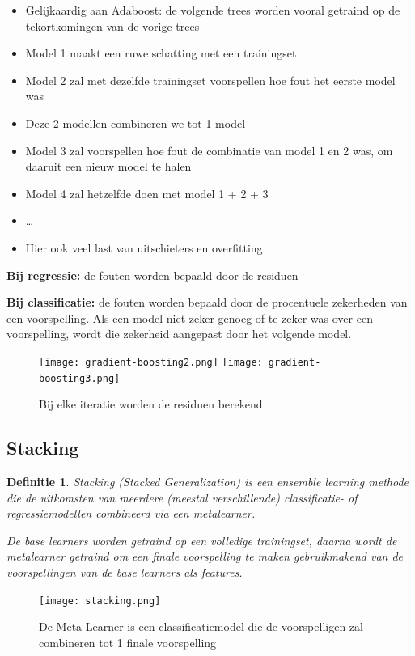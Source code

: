 \documentclass{article}
\newtheorem{theorem}{Definitie}[section]
\begin{document}
\begin{itemize}
    \item Gelijkaardig aan Adaboost: de volgende trees worden vooral getraind op de tekortkomingen van de vorige trees
    \item Model 1 maakt een ruwe schatting met een trainingset
    \item Model 2 zal met dezelfde trainingset voorspellen hoe fout het eerste model was
    \item Deze 2 modellen combineren we tot 1 model
    \item Model 3 zal voorspellen hoe fout de combinatie van model 1 en 2 was, om daaruit een nieuw model te halen
    \item Model 4 zal hetzelfde doen met model 1 + 2 + 3
    \item \dots
    \item Hier ook veel last van uitschieters en overfitting
\end{itemize}

\textbf{Bij regressie:} de fouten worden bepaald door de residuen

\textbf{Bij classificatie:} de fouten worden bepaald door de procentuele zekerheden van een voorspelling. Als een model niet zeker genoeg of te zeker was over een voorspelling, wordt die zekerheid aangepast door het volgende model.

\begin{figure}[H]
    \centering
    \texttt{[image: gradient-boosting2.png]}
    \texttt{[image: gradient-boosting3.png]}
    \caption{Bij elke iteratie worden de residuen berekend}
\end{figure}

\subsection{Stacking}

\begin{theorem}
    Stacking (Stacked Generalization) is een ensemble learning methode
    die de uitkomsten van meerdere (meestal verschillende) classificatie- of regressiemodellen 
    combineerd via een metalearner.

    De base learners worden getraind op een volledige trainingset, daarna wordt de
    metalearner getraind om een finale voorspelling te maken gebruikmakend van de voorspellingen
    van de base learners als features.
\end{theorem}

\begin{figure}[H]
    \centering
    \texttt{[image: stacking.png]}
    \caption{De Meta Learner is een classificatiemodel die de voorspelligen zal combineren tot 1 finale voorspelling}
\end{figure}
\end{document}

